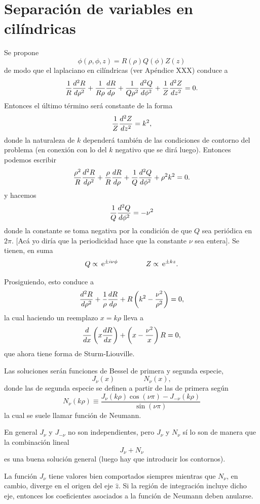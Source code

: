\documentclass[10pt,oneside]{CBFT_book}
\begin{document}
\section{Separación de variables en cilíndricas}

Se propone
\[
	\phi(\rho,\phi,z) = R(\rho) Q(\phi) Z(z)
\]
de modo que el laplaciano en cilíndricas (ver Apéndice XXX) conduce a
\[
	\frac{1}{R} \dtot[2]{R}{\rho} + \frac{1}{R\rho} \dtot{R}{\rho} + 
		\frac{1}{Q\rho^2} \dtot[2]{Q}{\phi} +
		\frac{1}{Z} \dtot[2]{Z}{z} = 0.
\]
Entonces el último término será constante de la forma
\[
	\frac{1}{Z} \dtot[2]{Z}{z} = k^2,
\]
donde la naturaleza de $k$ dependerá también de las condiciones de contorno del problema
(en conexión con lo del $k$ negativo que se dirá luego).
Entonces podemos escribir
\[
	\frac{\rho^2}{R} \dtot[2]{R}{\rho} + 
	\frac{\rho}{R} \dtot{R}{\rho} + 
	\frac{1}{Q} \dtot[2]{Q}{\phi} 
	+ \rho^2 k^2 = 0.
\]
y hacemos
\[
	\frac{1}{Q} \dtot[2]{Q}{\phi} = -\nu^2
\]
donde la constante se toma negativa por la condición de que $Q$ sea periódica en $2\pi$.
[Acá yo diría que la periodicidad hace que la constante $\nu$ sea entera].
Se tienen, en suma
\[
	Q \propto \euler^{ \pm i \nu \phi } \qquad\qquad  Z \propto \euler^{ \pm k z }.
\]

Prosiguiendo, esto conduce a 
\[
	\dtot[2]{R}{\rho} + \frac{1}{\rho} \dtot{R}{\rho} +
	R \left( k^2 -  \frac{\nu^2}{\rho^2} \right) = 0,
\]
la cual haciendo un reemplazo $x = k \rho$ lleva a
\[
	\dtot{}{x}\left( x \dtot{R}{x} \right) +
	\left( x -  \frac{\nu^2}{x} \right) R = 0,
\]
que ahora tiene forma de Sturm-Liouville.

Las soluciones serán funciones de Bessel de primera y segunda especie,
\[
	J_\nu (x) \qquad \qquad N_\nu(x), 
\]
donde las de segunda especie se definen a partir de las de primera según
\[
	N_\nu(k\rho) \equiv \frac{ J_\nu(k\rho) \cos(\nu\pi) - J_{-\nu}(k\rho)}{\sin(\nu\pi)}
\]
la cual se suele llamar función de Neumann.

En general $J_{\nu}$ y $J_{-\nu}$ no son independientes, pero $J_{\nu}$ y $N_{\nu}$ sí lo
son de manera que la combinación lineal
\[
	J_{\nu} + N_{\nu}
\]
es una buena solución general (luego hay que introducir los contornos).

La función $J_{\nu}$ tiene valores bien comportados siempres mientras que $N_{\nu}$, en cambio,
diverge en el origen del eje $\hat{z}$. Si la región de integración incluye dicho eje, entonces
los coeficientes asociados a la función de Neumann deben anularse.
\end{document}
